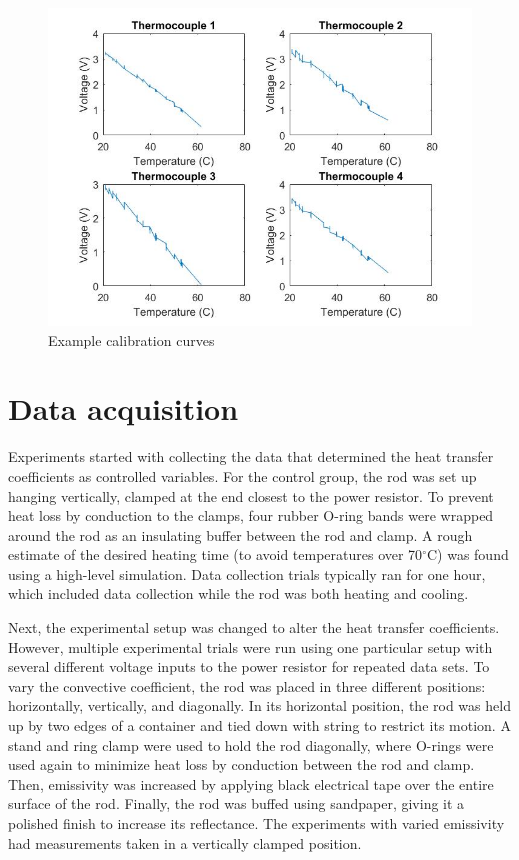 \documentclass[letterpaper,titlepage,oneside]{report}
\begin{document}
\begin{figure}[ht]
  \centering
  \includegraphics[width=.75\textwidth]{calib}
  \caption{Example calibration curves}
  \label{fig:calib}
\end{figure}

\section{Data acquisition}
Experiments started with collecting the data that determined the
heat transfer coefficients as controlled variables. For the
control group, the rod was set up hanging vertically, clamped
at the end closest to the power resistor. To prevent heat loss
by conduction to the clamps, four rubber O-ring bands were
wrapped around the rod as an insulating buffer between the rod and
clamp. A rough estimate of the desired heating time (to avoid
temperatures over 70$^{\circ}$C) was found using a high-level
simulation. Data collection trials typically ran for one hour,
which included data collection while the rod was both heating and
cooling.

Next, the experimental setup was changed to alter the heat transfer
coefficients. However, multiple experimental trials were run
using one particular setup with several different voltage inputs
to the power resistor for repeated data sets. To vary the
convective coefficient, the rod was placed in three different
positions: horizontally, vertically, and diagonally. In its
horizontal position, the rod was held up by two edges of
a container and tied down with string to restrict its motion.
A stand and ring clamp were used to hold the rod diagonally,
where O-rings were used again to minimize heat loss by
conduction between the rod and clamp. Then, emissivity was
increased by applying black electrical tape over the entire
surface of the rod. Finally, the rod was buffed using sandpaper,
giving it a polished finish to increase its reflectance.
The experiments with varied emissivity had measurements taken in
a vertically clamped position.
\end{document}
